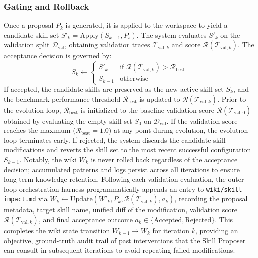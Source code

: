\documentclass[11pt, a4paper, copyright, gr]{google}
\begin{document}
\subsubsection{Gating and Rollback}
\label{subsubsec:gating}

Once a proposal $P_k$ is generated, it is applied to the workspace to yield a candidate skill set $S'_k = \text{Apply}(S_{k-1}, P_k)$. The system evaluates $S'_k$ on the validation split $\mathcal{D}_{\text{val}}$, obtaining validation traces $\mathcal{T}_{\text{val}, k}$ and score $\mathcal{R}(\mathcal{T}_{\text{val}, k})$. The acceptance decision is governed by:
\begin{equation}
S_k \leftarrow \begin{cases} 
S'_k & \text{if } \mathcal{R}(\mathcal{T}_{\text{val}, k}) > \mathcal{R}_{\text{best}} \\
S_{k-1} & \text{otherwise}
\end{cases}
\end{equation}
If accepted, the candidate skills are preserved as the new active skill set $S_k$, and the benchmark performance threshold $\mathcal{R}_{\text{best}}$ is updated to $\mathcal{R}(\mathcal{T}_{\text{val}, k})$. Prior to the evolution loop, $\mathcal{R}_{\text{best}}$ is initialized to the baseline validation score $\mathcal{R}(\mathcal{T}_{\text{val}, 0})$ obtained by evaluating the empty skill set $S_0$ on $\mathcal{D}_{\text{val}}$. If the validation score reaches the maximum ($\mathcal{R}_{\text{best}} = 1.0$) at any point during evolution, the evolution loop terminates early.  If rejected, the system discards the candidate skill modifications and reverts the skill set to the most recent successful configuration $S_{k-1}$. Notably, the wiki $W_k$ is never rolled back regardless of the acceptance decision; accumulated patterns and logs persist across all iterations to ensure long-term knowledge retention. Following each validation evaluation, the outer-loop orchestration harness programmatically appends an entry to \texttt{wiki/skill-impact.md} via $W_k \leftarrow \text{Update}(W'_k, P_k, \mathcal{R}(\mathcal{T}_{\text{val}, k}), a_k)$, recording the proposal metadata, target skill name, unified diff of the modification, validation score $\mathcal{R}(\mathcal{T}_{\text{val}, k})$, and final acceptance outcome $a_k \in \{\text{Accepted}, \text{Rejected}\}$. This completes the wiki state transition $W_{k-1} \to W_k$ for iteration $k$, providing an objective, ground-truth audit trail of past interventions that the Skill Proposer can consult in subsequent iterations to avoid repeating failed modifications.
\end{document}
